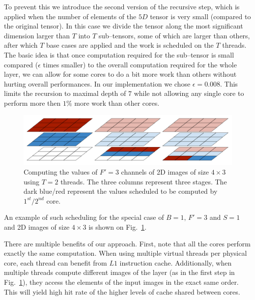   To prevent this we introduce the second version of the recursive
  step, which is applied when the number of elements of the $5D$
  tensor is very small (compared to the original tensor).  In this
  case we divide the tensor along the most significant dimension
  larger than $T$ into $T$ sub--tensors, some of which are larger than
  others, after which $T$ base cases are applied and the work is
  scheduled on the $T$ threads.  The basic idea is that once
  computation required for the sub--tensor is small compared
  ($\epsilon$ times smaller) to the overall computation required for
  the whole layer, we can allow for some cores to do a bit more work
  than others without hurting overall performances.  In our
  implementation we chose $\epsilon = 0.008$.  This limits the
  recursion to maximal depth of $7$ while not allowing any single core
  to perform more then $1\%$ more work than other cores.

  \begin{figure}
    \begin{center}
      \includegraphics[width=0.67\linewidth]{fig/static2}
    \end{center}
    \caption{Computing the values of $F'=3$ channels of 2D images of
      size $4 \times 3$ using $T=2$ threads.  The three columns
      represent three stages.  The dark blue/red represent the values
      scheduled to be computed by $1^{st}/2^{nd}$ core.}
    \label{fig:problem-subdivision}
  \end{figure}

  An example of such scheduling for the special case of $B=1$, $F'=3$
  and $S=1$ and 2D images of size $4 \times 3$ is shown on
  Fig.~\ref{fig:problem-subdivision}.

  There are multiple benefits of our approach.  First, note that all
  the cores perform exactly the same computation.  When using multiple
  virtual threads per physical core, each thread can benefit from $L1$
  instruction cache.  Additionally, when multiple threads compute
  different images of the layer (as in the first step in
  Fig.~\ref{fig:problem-subdivision}), they access the elements of the
  input images in the exact same order.  This will yield high hit rate
  of the higher levels of cache shared between cores.

